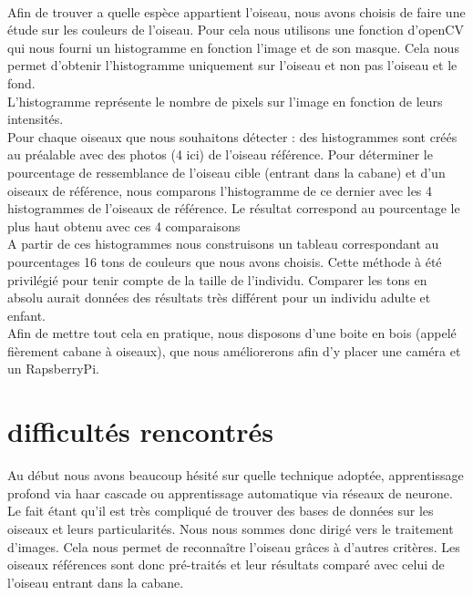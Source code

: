 \documentclass{article}
\begin{document}
\paragraph {}
Afin de trouver a quelle espèce appartient l'oiseau, nous avons choisis de faire une étude sur les couleurs de l'oiseau. Pour cela nous utilisons une fonction d'openCV qui nous fourni un histogramme en fonction l'image et de son masque. Cela nous permet d'obtenir l'histogramme uniquement sur l'oiseau et non pas l'oiseau et le fond. \\
L'histogramme représente le nombre de pixels sur l'image en fonction de leurs intensités.\\

Pour chaque oiseaux que nous souhaitons détecter : des histogrammes sont créés au préalable avec des photos (4 ici) de l'oiseau référence.
Pour déterminer le pourcentage de ressemblance de l'oiseau cible (entrant dans la cabane) et d'un oiseaux de référence, nous comparons l'histogramme de ce dernier avec les 4 histogrammes de l'oiseaux de référence. Le résultat correspond au pourcentage le plus haut obtenu avec ces 4 comparaisons\\

A partir de ces histogrammes nous construisons un tableau correspondant au pourcentages 16 tons de couleurs que nous avons choisis.
Cette méthode à été privilégié pour tenir compte de la taille de l'individu.
Comparer les tons en absolu aurait données des résultats très différent pour un individu adulte et enfant. \\

Afin de mettre tout cela en pratique, nous disposons d'une boite en bois  (appelé fièrement cabane à oiseaux), que nous améliorerons afin d'y placer une caméra et un RapsberryPi.\\


\section{difficultés rencontrés}

Au début nous avons beaucoup hésité sur quelle technique adoptée, apprentissage profond via haar cascade ou apprentissage automatique via réseaux de neurone. Le fait étant qu'il est très compliqué  de trouver des bases de données sur les oiseaux et leurs particularités. Nous nous sommes donc dirigé vers le traitement d'images. Cela nous permet  de reconnaître l'oiseau grâces à d'autres critères. Les oiseaux références sont donc pré-traités et leur résultats comparé avec celui de l'oiseau entrant dans la cabane. \\ 
\end{document}
